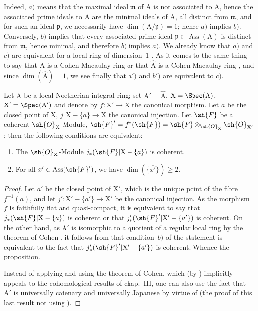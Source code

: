 
Indeed, $a)$ means that the maximal ideal $\mathfrak{m}$ of $\mathrm{A}$ is not associated to $\mathrm{A}$, hence the associated prime ideals to $\mathrm{A}$ are the minimal ideals of $\mathrm{A}$, all distinct from $\mathfrak{m}$, and for such an ideal $\mathfrak{p}$, we necessarily have $\dim(\mathrm{A}/\mathfrak{p})=1$; hence $a)$ implies $b)$.
Conversely, $b)$ implies that every associated prime ideal $\mathfrak{p}\in\operatorname{Ass}(\mathrm{A})$ is distinct from $\mathfrak{m}$, hence minimal, and therefore $b)$ implies $a)$.
We already know that $a)$ and $c)$ are equivalent for a local ring of dimension~$1$ .
As it comes to the same thing to say that $\mathrm{A}$ is a Cohen-Macaulay ring or that $\widehat{\mathrm{A}}$ is a Cohen-Macaulay ring , and since $\dim(\widehat{\mathrm{A}})=1$, we see finally that $a')$ and $b')$ are equivalent to $c)$.

\begin{proposition}[7.2.2]
\label{IV.7.2.2}
Let $\mathrm{A}$ be a local Noetherian integral ring; set $\mathrm{A}'=\widehat{\mathrm{A}}$, $\mathrm{X}=\Spec(\mathrm{A})$, $\mathrm{X}'=\Spec(\mathrm{A}')$ and denote by $f:\mathrm{X}'\to\mathrm{X}$ the canonical morphism.
Let $a$ be the closed point of $\mathrm{X}$, $j:\mathrm{X}-\{a\}\to\mathrm{X}$ the canonical injection.
Let $\sh{F}$ be a coherent $\sh{O}_\mathrm{X}$-Module, $\sh{F}'=f^*(\sh{F})=\sh{F}\otimes_{\sh{O}_\mathrm{X}}\sh{O}_{\mathrm{X}'}$; then the following conditions are equivalent:
\begin{enumerate}[label=\emph{\alph*)}]
  \item The $\sh{O}_\mathrm{X}$-Module $j_*(\sh{F}|\mathrm{X}-\{a\})$ is coherent.
  \item For all $x'\in\operatorname{Ass}(\sh{F}')$, we have $\dim(\overline{\{x'\}})\geqslant 2$.
\end{enumerate}
\end{proposition}

\begin{proof}
Let $a'$ be the closed point of $\mathrm{X}'$, which is the unique point of the fibre $f^{-1}(a)$, and let $j':\mathrm{X}'-\{a'\}\to\mathrm{X}'$ be the canonical injection.
As the morphism $f$ is faithfully flat and quasi-compact, it is equivalent to say that $j_*(\sh{F}|\mathrm{X}-\{a\})$ is coherent or that $j'_*(\sh{F}'|\mathrm{X}'-\{a'\})$ is coherent.
On the other hand, as $\mathrm{A}'$ is isomorphic to a quotient of a regular local ring by the theorem of Cohen , it follows from  that condition~$b)$ of the statement is equivalent to the fact that $j'_*(\sh{F}'|\mathrm{X}'-\{a'\})$ is coherent.
Whence the proposition.

Instead of applying  and using the theorem of Cohen, which (by ) implicitly appeals to the cohomological results of chap.~III, one can also use the fact that $\mathrm{A}'$ is universally catenary  and universally Japanese by virtue of  (the proof of this last result not using ).
\end{proof}

